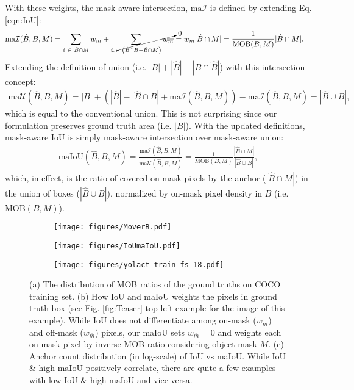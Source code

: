 \documentclass{bmvc2k}
\begin{document}
With these weights, the mask-aware intersection, $\mathrm{ma}\mathcal{I}$ is defined by extending Eq. \ref{eqn:IoU}:
\begin{align}
     \mathrm{ma}\mathcal{I} (\hat{B}, B, M) & = \sum_{i\ \in\ \hat{B} \cap M} w_m +  \cancelto{0}{\sum_{i\ \in\ \left( \hat{B} \cap B-\hat{B} \cap M \right )} w_{\overline{m}}}= w_m |\hat{B} \cap M| = \frac{ 1}{\mathrm{MOB}(B,M)}|\hat{B} \cap M|.
\end{align}
Extending the definition of union (i.e. $|B|+|\hat{B}|-|B \cap \hat{B}|$) with this intersection concept:
\begin{align}
    \mathrm{ma}\mathcal{U} (\hat{B}, B, M) = |B| + (|\hat{B}|-|\hat{B} \cap B| + \mathrm{ma}\mathcal{I}(\hat{B}, B, M)) - \mathrm{ma}\mathcal{I} (\hat{B}, B, M) = |\hat{B} \cup B|,
\end{align}
which is equal to the conventional union. This is not surprising since our formulation preserves ground truth area (i.e. $|B|$). With the updated definitions, mask-aware IoU is simply mask-aware intersection over mask-aware union:
\begin{align}
    \label{eq:Definition1}
    \mathrm{maIoU} (\hat{B}, B, M) = \frac{\mathrm{ma}\mathcal{I} (\hat{B}, B, M)}{\mathrm{ma}\mathcal{U} (\hat{B}, B, M)} =  \frac{1}{\mathrm{MOB}(B,M)}\frac{|\hat{B} \cap M|}{|\hat{B} \cup B|},
\end{align}
which, in effect, is the ratio of covered on-mask pixels by the anchor ($|\hat{B} \cap M|$) in the union of boxes ($|\hat{B} \cup B|$), normalized by on-mask pixel density in $B$ (i.e. $\mathrm{MOB}(B,M)$).

 \begin{figure}
        \captionsetup[subfigure]{}
        \centering
        \begin{subfigure}[b]{0.35\textwidth}
                \texttt{[image: figures/MoverB.pdf]}
                \caption{}
        \end{subfigure}       
        \begin{subfigure}[b]{0.3\textwidth}
                \texttt{[image: figures/IoUmaIoU.pdf]}
\caption{}
        \end{subfigure}
        \begin{subfigure}[b]{0.27\textwidth}
                \texttt{[image: figures/yolact\_train\_fs\_18.pdf]}
                \caption{}
        \end{subfigure}             
        \caption{(a) The distribution of MOB ratios of the ground truths on COCO training set. (b) How IoU and maIoU weights the pixels in ground truth box (see Fig. \ref{fig:Teaser} top-left example for the image of this example). While IoU does not differentiate among on-mask ($w_m$) and off-mask ($w_{\overline{m}}$) pixels, our maIoU sets $w_{\overline{m}}=0$ and weights each on-mask pixel by inverse MOB ratio considering object mask $M$. (c) Anchor count distribution (in log-scale) of IoU vs maIoU. While $\mathrm{IoU}$ \& high-$\mathrm{maIoU}$ positively correlate, there are quite a few examples with low-$\mathrm{IoU}$ \& high-$\mathrm{maIoU}$ and vice versa.}
        \label{fig:MOB}
\end{figure}
\end{document}
